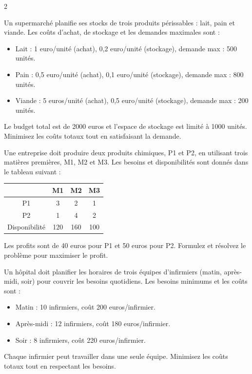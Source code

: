 \begin{multicols}{2}
\begin{exo}
	Un supermarché planifie ses stocks de trois produits périssables : lait, pain et viande. Les coûts d'achat, de stockage et les demandes maximales sont :
	\begin{itemize}
		\item Lait : 1 euro/unité (achat), 0,2 euro/unité (stockage), demande max : 500 unités.
		\item Pain : 0,5 euro/unité (achat), 0,1 euro/unité (stockage), demande max : 800 unités.
		\item Viande : 5 euros/unité (achat), 0,5 euro/unité (stockage), demande max : 200 unités.
	\end{itemize}
	Le budget total est de 2000 euros et l'espace de stockage est limité à 1000 unités. Minimisez les coûts totaux tout en satisfaisant la demande.
\end{exo}

\begin{exo}
	Une entreprise doit produire deux produits chimiques, P1 et P2, en utilisant trois matières premières, M1, M2 et M3. Les besoins et disponibilités sont donnés dans le tableau suivant :
	\begin{center}
		\begin{tabular}{c|ccc}
			& M1 & M2 & M3 \\
			\hline
			P1 & 3 & 2 & 1 \\
			P2 & 1 & 4 & 2 \\
			Disponibilité & 120 & 160 & 100 \\
		\end{tabular}
	\end{center}
	Les profits sont de 40 euros pour P1 et 50 euros pour P2. Formulez et résolvez le problème pour maximiser le profit.
\end{exo}

\begin{exo}
	Un hôpital doit planifier les horaires de trois équipes d'infirmiers (matin, après-midi, soir) pour couvrir les besoins quotidiens. Les besoins minimums et les coûts sont :
	\begin{itemize}
		\item Matin : 10 infirmiers, coût 200 euros/infirmier.
		\item Après-midi : 12 infirmiers, coût 180 euros/infirmier.
		\item Soir : 8 infirmiers, coût 220 euros/infirmier.
	\end{itemize}
	Chaque infirmier peut travailler dans une seule équipe. Minimisez les coûts totaux tout en respectant les besoins.
\end{exo}


\end{multicols}

